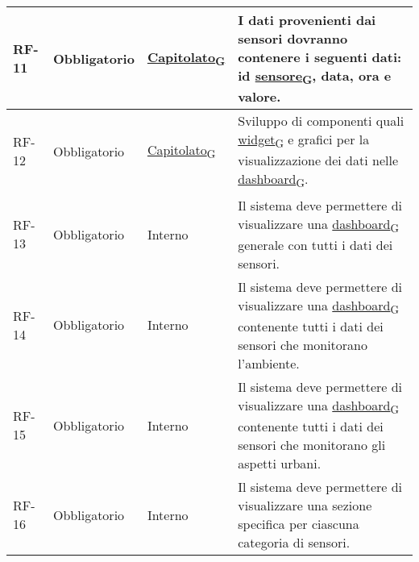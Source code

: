 \begin{longtable}{|>{\centering\arraybackslash}m{}|>{\centering\arraybackslash}m{}|>{\centering\arraybackslash}m{}|>{\centering\arraybackslash}m{}|}
	\\\hline
	RF-11           & Obbligatorio        & \href{https://7last.github.io/docs/pb/documentazione-interna/glossario\#capitolato}{Capitolato\textsubscript{G}} & I dati provenienti dai sensori dovranno contenere i seguenti dati: id \href{https://7last.github.io/docs/pb/documentazione-interna/glossario\#sensore}{sensore\textsubscript{G}}, data, ora e valore.
	\\\hline
	RF-12           & Obbligatorio        & \href{https://7last.github.io/docs/pb/documentazione-interna/glossario\#capitolato}{Capitolato\textsubscript{G}} & Sviluppo di componenti quali \href{https://7last.github.io/docs/pb/documentazione-interna/glossario\#widget}{widget\textsubscript{G}} e grafici per la visualizzazione dei dati nelle \href{https://7last.github.io/docs/pb/documentazione-interna/glossario\#dashboard}{dashboard\textsubscript{G}}.
	\\\hline
	RF-13           & Obbligatorio        & Interno                                                                                                           & Il sistema deve permettere di visualizzare una \href{https://7last.github.io/docs/pb/documentazione-interna/glossario\#dashboard}{dashboard\textsubscript{G}} generale con tutti i dati dei sensori.
	\\\hline
	RF-14           & Obbligatorio        & Interno                                                                                                           & Il sistema deve permettere di visualizzare una \href{https://7last.github.io/docs/pb/documentazione-interna/glossario\#dashboard}{dashboard\textsubscript{G}} contenente tutti i dati dei sensori che monitorano l'ambiente.
	\\\hline
	RF-15           & Obbligatorio        & Interno                                                                                                           & Il sistema deve permettere di visualizzare una \href{https://7last.github.io/docs/pb/documentazione-interna/glossario\#dashboard}{dashboard\textsubscript{G}} contenente tutti i dati dei sensori che monitorano gli aspetti urbani.
	\\\hline
	RF-16           & Obbligatorio        & Interno                                                                                                           & Il sistema deve permettere di visualizzare una sezione specifica per ciascuna categoria di sensori.
	\\\hline

\end{longtable}
